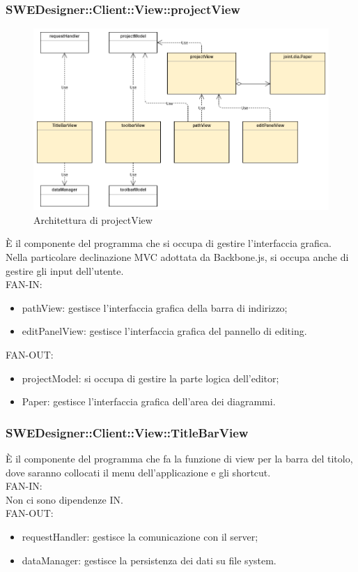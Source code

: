 \documentclass[../PianoDiQualifica.tex]{subfiles}
\begin{document}
		\subsubsection{SWEDesigner::Client::View::projectView}
			\begin{figure}[H]\label{fig:MainModel}
				\centering
				\includegraphics[scale=0.44]{Immagini/DiagrammaArchitettura/MainView.png}
				\caption{Architettura di projectView}
			\end{figure}
		È il componente del programma che si occupa di gestire l'interfaccia grafica. Nella particolare declinazione MVC adottata da Backbone.js, si occupa anche di gestire gli input dell'utente.\\
			FAN-IN:
			\begin{itemize}
				\item pathView: gestisce l'interfaccia grafica della barra di indirizzo;
				\item editPanelView: gestisce l'interfaccia grafica del pannello di editing.
			\end{itemize}
			FAN-OUT:
			\begin{itemize}
				\item projectModel: si occupa di gestire la parte logica dell'editor;
				\item Paper: gestisce l'interfaccia grafica dell'area dei diagrammi.
			\end{itemize}
		\subsubsection{SWEDesigner::Client::View::TitleBarView}
		È il componente del programma che fa la funzione di view per la barra del titolo, dove saranno collocati il menu dell’applicazione e gli shortcut.\\
			FAN-IN:\\
			Non ci sono dipendenze IN.\\
			FAN-OUT:
			\begin{itemize}
				\item requestHandler: gestisce la comunicazione con il server;
				\item dataManager: gestisce la persistenza dei dati su file system.
			\end{itemize}
\end{document}
